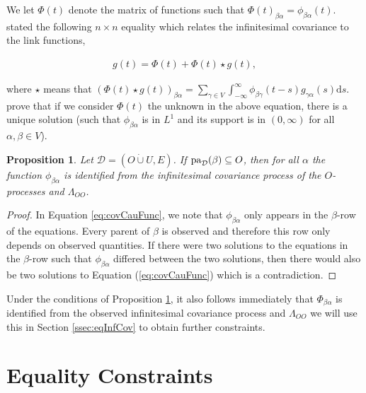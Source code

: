 \documentclass[accepted]{uai2021} %
\newcommand{\md}{\mathrm{d}}
\newtheorem{prop}[thm]{Proposition}
\newcommand{\pa}{\textnormal{pa}}
\newcommand{\disjU}{\mathbin{\dot{\cup}}}
\begin{document}
We let $\Phi(t)$ denote the matrix of functions such that 
$\Phi(t)_{\beta\alpha} = 
\phi_{\beta\alpha}(t)$. \cite{hawkesJRSSB1971} stated the following $n\times n$ 
equality 
which 
relates the infinitesimal covariance to the link functions,

\begin{align}
	g(t) = \Phi(t) + \Phi(t) \star g(t),
	\label{eq:covCauFunc}
\end{align}

where $\star$ means that $(\Phi(t) \star g(t))_{\beta\alpha} = \sum_{\gamma \in 
V} 
\int_{-\infty}^{\infty} \phi_{\beta\gamma}(t - s) g_{\gamma\alpha}(s) \md s$. 
\cite{bacry2016} 
prove that if we consider $\Phi(t)$ 
the 
unknown in the above equation, there is a unique solution (such that 
$\phi_{\beta\alpha}$ is in $L^1$ and its support is in $(0,\infty)$ for all 
$\alpha,\beta\in V$).

\begin{prop}
	Let $\mathcal{D} = (O\disjU U, E)$. If $\pa_\mathcal{D}(\beta) \subseteq 
	O$, then for all $\alpha$ the function $\phi_{\beta\alpha}$ is identified 
	from 
	the infinitesimal covariance process of the $O$-processes and 
	$\Lambda_{OO}$.
	\label{prop:gPaId}
\end{prop}

\begin{proof}
	In Equation \ref{eq:covCauFunc}, we note that $\phi_{\beta\alpha}$ only 
	appears in the $\beta$-row of the equations. Every parent of $\beta$ is 
	observed and therefore this row only depends on observed quantities. If 
	there were two solutions to the equations in the $\beta$-row such that 
	$\phi_{\beta\alpha}$ differed between the two solutions, then there would 
	also 
	be two solutions to Equation (\ref{eq:covCauFunc}) which is a contradiction.
\end{proof}

Under the conditions of Proposition \ref{prop:gPaId}, it also follows 
immediately that $\Phi_{\beta\alpha}$ is identified from the observed 
infinitesimal covariance process and $\Lambda_{OO}$ we will use this in Section 
\ref{ssec:eqInfCov} to obtain further constraints.


\section{Equality Constraints}
\end{document}
